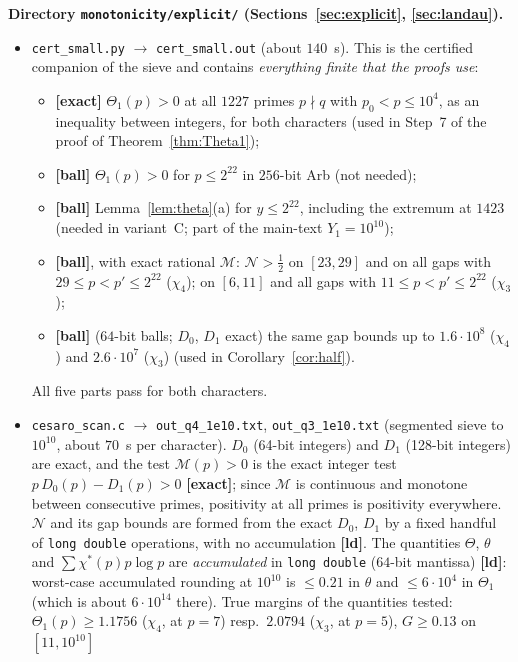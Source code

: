 \documentclass[11pt]{amsart}
\theoremstyle{definition}
\numberwithin{equation}{section}
\newcommand{\cM}{\mathcal M}          %
\newcommand{\cN}{\mathcal N}          %
\begin{document}
\noindent\textbf{Directory \texttt{monotonicity/explicit/}
(Sections~\ref{sec:explicit}, \ref{sec:landau}).}
\begin{itemize}
\item \texttt{cert\_small.py} $\to$ \texttt{cert\_small.out}
(about $140$~s). This is the certified companion of the sieve and
contains \emph{everything finite that the proofs use}:
\begin{itemize}
\item[(A)] \textbf{[exact]} $\Theta_1(p)>0$ at all $1227$ primes
$p\nmid q$ with $p_0<p\le10^4$, as an inequality between integers,
for both characters (used in Step~7 of the proof of
Theorem~\ref{thm:Theta1});
\item[(B)] \textbf{[ball]} $\Theta_1(p)>0$ for $p\le2^{22}$ in
$256$-bit Arb (not needed);
\item[(C)] \textbf{[ball]} Lemma~\ref{lem:theta}(a) for
$y\le2^{22}$, including the extremum at $1423$ (needed in
variant~C; part of the main-text $Y_1=10^{10}$);
\item[(D)] \textbf{[ball]}, with exact rational $\cM$:
$\cN>\tfrac12$ on $[23,29]$ and on all gaps with
$29\le p<p'\le2^{22}$ ($\chi_4$); on $[6,11]$ and all gaps with
$11\le p<p'\le2^{22}$ ($\chi_3$);
\item[(E)] \textbf{[ball]} ($64$-bit balls; $D_0$, $D_1$ exact) the
same gap bounds up to $1.6\cdot10^8$ ($\chi_4$) and $2.6\cdot10^7$
($\chi_3$) (used in Corollary~\ref{cor:half}).
\end{itemize}
All five parts pass for both characters.
\item \texttt{cesaro\_scan.c} $\to$ \texttt{out\_q4\_1e10.txt},
\texttt{out\_q3\_1e10.txt} (segmented sieve to $10^{10}$, about
$70$~s per character). $D_0$ (64-bit integers) and $D_1$ (128-bit
integers) are exact, and the test $\cM(p)>0$ is the exact integer
test $p\,D_0(p)-D_1(p)>0$ \textbf{[exact]}; since $\cM$ is
continuous and monotone between consecutive primes, positivity at
all primes is positivity everywhere. $\cN$ and its gap bounds are
formed from the exact $D_0$, $D_1$ by a fixed handful of
\texttt{long double} operations, with no accumulation
\textbf{[ld]}. The quantities $\Theta$, $\theta$ and
$\sum\chi^*(p)p\log p$ are \emph{accumulated} in \texttt{long
double} ($64$-bit mantissa) \textbf{[ld]}: worst-case accumulated
rounding at $10^{10}$ is $\le0.21$ in $\theta$ and $\le6\cdot10^4$
in $\Theta_1$ (which is about $6\cdot10^{14}$ there). True margins of
the quantities tested: $\Theta_1(p)\ge1.1756$ ($\chi_4$, at $p=7$)
resp.\ $2.0794$ ($\chi_3$, at $p=5$), $G\ge0.13$ on $[11,10^{10}]$

\end{itemize}
\end{document}

